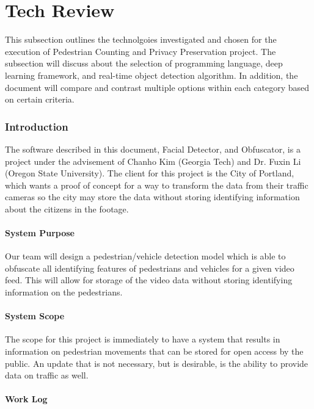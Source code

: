 \chapter{Tech Review}

This subsection outlines the technolgoies investigated and chosen for the execution of Pedestrian Counting and Privacy Preservation project. The subsection will discuss about the selection of programming language, deep learning framework, and real-time object detection algorithm. In addition, the document will compare and contrast multiple options within each category based on certain criteria.
\subsection{Introduction}
The software described in this document, Facial Detector, and Obfuscator, is a project under the advisement of Chanho Kim (Georgia Tech) and Dr. Fuxin Li (Oregon State University). The client for this project is the City of Portland, which wants a proof of concept for a way to transform the data from their traffic cameras so the city may store the data without storing identifying information about the citizens in the footage.

\subsubsection{System Purpose}
Our team will design a pedestrian/vehicle detection model which is able to obfuscate all identifying features of pedestrians and vehicles for a given video feed. This will allow for storage of the video data without storing identifying information on the pedestrians.

\subsubsection{System Scope}
The scope for this project is immediately to have a system that results in information on pedestrian movements that can be stored for open access by the public. An update that is not necessary, but is desirable, is the ability to provide data on traffic as well.

\subsubsection{Work Log}

